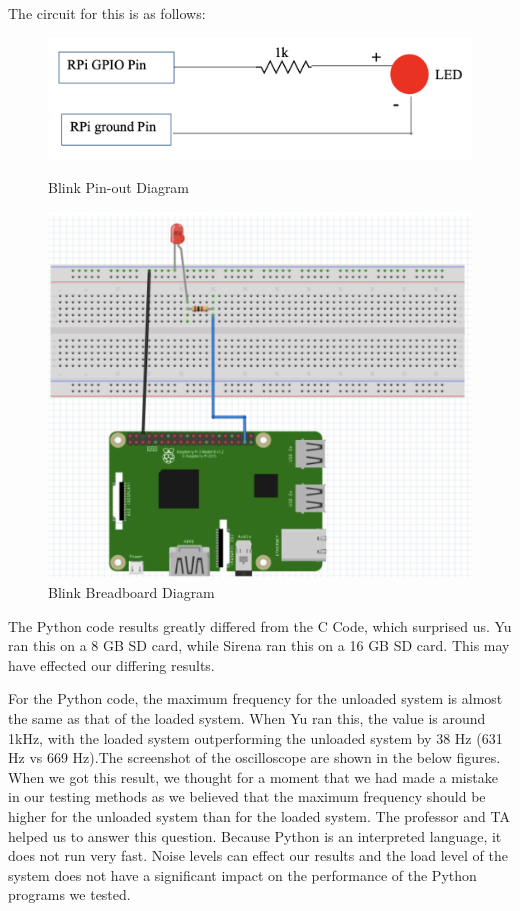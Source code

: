 \documentclass[a4paper,10pt]{article}
\begin{document}
The circuit for this is as follows:

\begin{figure}[H]
\centering
\begin{minipage}{0.5\textwidth}
  \centering
  \includegraphics[width=0.9\linewidth]{Images/pinout diagram.png}
  \caption{Blink Pin-out Diagram}
\end{minipage}%
\begin{minipage}{0.5\textwidth}
  \centering
  \includegraphics[width=0.9\linewidth]{Images/breadboard diagram.png}
  \caption{Blink Breadboard Diagram}
\end{minipage}
\end{figure}

The Python code results greatly differed from the C Code, which surprised us. Yu ran this on a 8 GB SD card, while Sirena ran this on a 16 GB SD card. This may have effected our differing results.

For the Python code, the maximum frequency for the unloaded system is almost the same as that of the loaded system. When Yu ran this, the value is around 1kHz, with the loaded system outperforming the unloaded system by 38 Hz (631 Hz vs 669 Hz).The screenshot of the oscilloscope are shown in the below figures. When we got this result, we thought for a moment that we had made a mistake in our testing methods as we believed that the maximum frequency should be higher for the unloaded system than for the loaded system. The professor and TA helped us to answer this question. Because Python is an interpreted language, it does not run very fast. Noise levels can effect our results and the load level of the system does not have a significant impact on the performance of the Python programs we tested.
\end{document}
